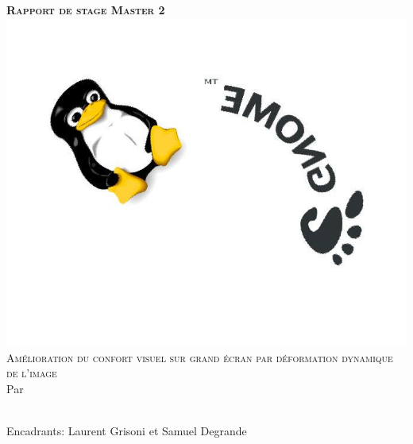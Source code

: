 \makeatletter
\begin{titlepage}
\centering
\vspace{-10em}
{\LARGE \textbf{\textsc{Rapport de stage Master 2}}}\\
\vspace{3em}
\includegraphics[scale=0.45]{image/cover.jpg}\\
\vspace{3em}
{\LARGE \textsc{Amélioration du confort visuel sur grand écran par déformation dynamique de l'image}}\\

\vspace{8em}
Par\\
\vspace{1em}
{\LARGE \@author}\\

\vspace{2em}

\flushleft Encadrants: Laurent Grisoni et Samuel Degrande 


\end{titlepage}
\makeatother

\sloppy